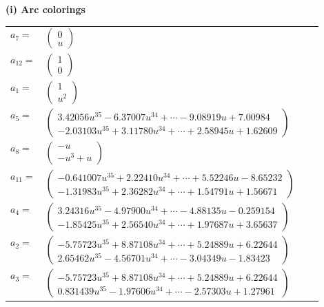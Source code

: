 \documentclass[1p]{elsarticle_modified}
\theoremstyle{definition}
\begin{document}
\flushleft \textbf{(i) Arc colorings}\\
\begin{tabular}{m{7pt} m{180pt} m{7pt} m{180pt} }
\flushright $a_{7}=$&$\begin{pmatrix}0\\u\end{pmatrix}$ \\
\flushright $a_{12}=$&$\begin{pmatrix}1\\0\end{pmatrix}$ \\
\flushright $a_{1}=$&$\begin{pmatrix}1\\u^2\end{pmatrix}$ \\
\flushright $a_{5}=$&$\begin{pmatrix}3.42056 u^{35}-6.37007 u^{34}+\cdots-9.08919 u+7.00984\\-2.03103 u^{35}+3.11780 u^{34}+\cdots+2.58945 u+1.62609\end{pmatrix}$ \\
\flushright $a_{8}=$&$\begin{pmatrix}- u\\- u^3+u\end{pmatrix}$ \\
\flushright $a_{11}=$&$\begin{pmatrix}-0.641007 u^{35}+2.22410 u^{34}+\cdots+5.52246 u-8.65232\\-1.31983 u^{35}+2.36282 u^{34}+\cdots+1.54791 u+1.56671\end{pmatrix}$ \\
\flushright $a_{4}=$&$\begin{pmatrix}3.24316 u^{35}-4.97900 u^{34}+\cdots-4.88135 u-0.259154\\-1.85425 u^{35}+2.56540 u^{34}+\cdots+1.97687 u+3.65637\end{pmatrix}$ \\
\flushright $a_{2}=$&$\begin{pmatrix}-5.75723 u^{35}+8.87108 u^{34}+\cdots+5.24889 u+6.22644\\2.65462 u^{35}-4.56701 u^{34}+\cdots-3.04349 u-1.83423\end{pmatrix}$ \\
\flushright $a_{3}=$&$\begin{pmatrix}-5.75723 u^{35}+8.87108 u^{34}+\cdots+5.24889 u+6.22644\\0.831439 u^{35}-1.97606 u^{34}+\cdots-2.57303 u+1.27961\end{pmatrix}$ \\

\end{tabular}
\end{document}
